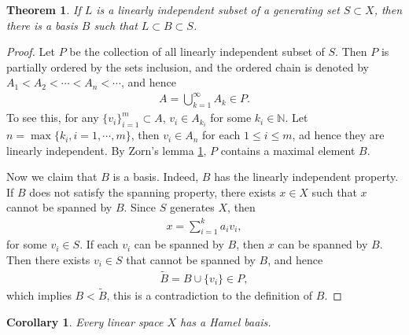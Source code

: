 \documentclass[11pt]{book}
\newtheorem{theorem}{Theorem}[chapter]
\newtheorem{corollary}{Corollary}[theorem]
\theoremstyle{definition}
\numberwithin{equation}{chapter}
\begin{document}
\begin{theorem}\label{th_157}
If $L$ is a linearly independent subset of a generating set $S \subset X$, then there is a basis $B$ such that $L \subset B \subset S$.
\end{theorem}
\begin{proof}
Let $P$ be the collection of all linearly independent subset of $S$. Then $P$ is partially ordered by the sets inclusion, and the ordered chain is denoted by $A_1 < A_2 < \cdots < A_n < \cdots$, and hence
\begin{align*}
    A = \bigcup^\infty_{k=1} A_k \in P.
\end{align*}
To see this, for any $\{v_i\}^m_{i=1} \subset A$, $v_i \in A_{k_i}$ for some $k_i \in \mathbb{N}$. Let $n = \max \{k_i, i = 1,\cdots,m\}$, then $v_i \in A_n$ for each $1 \leq i \leq m$, ad hence they are linearly independent. By Zorn's lemma \ref{th_157}, $P$ contains a maximal element $B$. 

Now we claim that $B$ is a basis. Indeed, $B$ has the linearly independent property. If $B$ does not satisfy the spanning property, there exists $x \in X$ such that $x$ cannot be spanned by $B$. Since $S$ generates $X$, then 
\begin{align*}
    x = \sum^k_{i=1} a_i v_i,
\end{align*}
for some $v_i \in S$. If each $v_i$ can be spanned by $B$, then $x$ can be spanned by $B$. Then there exists $v_i \in S$ that cannot be spanned by $B$, and hence
\begin{align*}
    \widetilde{B} = B \cup \{v_i\} \in P,
\end{align*}
which implies $B < \widetilde{B}$, this is a contradiction to the definition of $B$.
\end{proof}

\medskip

\begin{corollary}
Every linear space $X$ has a Hamel baais.
\end{corollary}

\medskip
\end{document}
